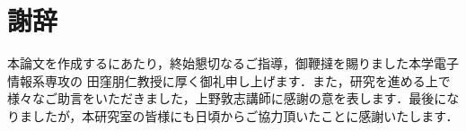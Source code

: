 \documentclass[autodetect-engine,dvipdfmx-if-dvi,ja=standard,a4j,jbase=11pt,magstyle=nomag*]{bxjsreport}
\begin{document}
\chapter*{謝辞}

本論文を作成するにあたり，終始懇切なるご指導，御鞭撻を賜りました本学電子情報系専攻の
田窪朋仁教授に厚く御礼申し上げます．また，研究を進める上で様々なご助言をいただきました，上野敦志講師に感謝の意を表します．最後になりましたが，本研究室の皆様にも日頃からご協力頂いたことに感謝いたします．
\end{document}
